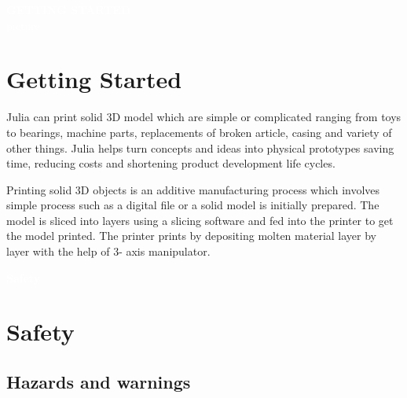 \documentclass{article}
\begin{document}
\pagecolor{grey}\afterpage{\nopagecolor}
\Huge\textbf{\textcolor{white}{GETTING STARTED}}\\


\textcolor{white}{picture}\\
\thispagestyle{empty}
\cleardoublepage
\normalsize


\section{Getting Started}\label{sec:Getting Started}

Julia can print solid 3D model which are simple or complicated ranging from toys to bearings, machine parts, replacements of broken article, casing and variety of other things. Julia helps turn concepts and ideas into physical prototypes saving time, reducing costs and shortening product development life cycles.

Printing solid 3D objects is an additive manufacturing process which involves simple process such as a digital file or a solid model is initially prepared. The model is sliced into layers using a slicing software and fed into the printer to get the model printed. The printer prints by depositing molten material layer by layer with the help of 3- axis manipulator.  

\cleardoublepage


\pagecolor{grey}\afterpage{\nopagecolor}
\Huge\textbf{\textcolor{white}{Safety}}\\
\thispagestyle{empty}
\cleardoublepage
\normalsize

\section{Safety}\label{sec:Safety}
\subsection{\textbf{Hazards and warnings}}
\end{document}
